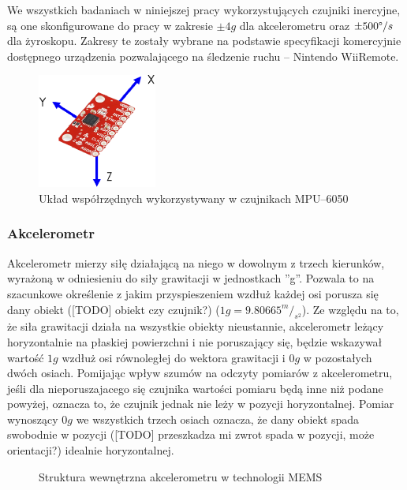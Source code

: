 We wszystkich badaniach w niniejszej pracy wykorzystujących czujniki inercyjne, są one skonfigurowane do pracy w zakresie  $\pm4g$ dla akcelerometru oraz $\pm500\degree/s$dla żyroskopu. Zakresy te zostały wybrane na podstawie specyfikacji komercyjnie dostępnego urządzenia pozwalającego na śledzenie ruchu -- Nintendo WiiRemote.

\begin{figure}[!htp]
	\centering 
	\includegraphics[width=0.35\textwidth]{images/imuCoordinationSpace.eps}	
	\caption{Układ współrzędnych wykorzystywany w czujnikach MPU--6050}
	\label{fig:characteristics:imu:space}
\end{figure}


\subsubsection*{Akcelerometr}
Akcelerometr mierzy siłę działającą na niego w dowolnym z trzech kierunków, wyrażoną w odniesieniu do siły grawitacji w jednostkach ''g''. Pozwala to na szacunkowe określenie z jakim przyspieszeniem wzdłuż każdej osi porusza się dany obiekt ([TODO] obiekt czy czujnik?) ($1g =9.80665^m/_{s^2}$). Ze względu na to, że siła grawitacji działa na wszystkie obiekty nieustannie, akcelerometr leżący horyzontalnie na płaskiej powierzchni i nie poruszający się, będzie wskazywał wartość $1g$ wzdłuż osi równoległej do wektora grawitacji i $0g$ w pozostałych dwóch osiach. Pomijając wpływ szumów na odczyty pomiarów z akcelerometru, jeśli dla nieporuszajacego się czujnika wartości pomiaru będą inne niż podane powyżej, oznacza to, że czujnik jednak nie leży w pozycji horyzontalnej. Pomiar wynoszący $0g$ we wszystkich trzech osiach oznacza, że dany obiekt spada swobodnie w pozycji ([TODO] przeszkadza mi zwrot spada w pozycji, może orientacji?) idealnie horyzontalnej.\\

\begin{figure}[!htp]

	\caption{Struktura wewnętrzna akcelerometru w technologii MEMS}
	\label{fig:characteristics:imu:acc:mems}
\end{figure}

